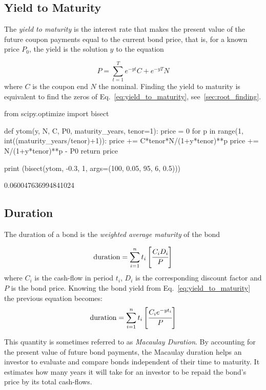 \subsection{Yield to Maturity}
The \emph{yield to maturity} is the interest rate that makes the present value of the future coupon payments equal to the current bond price, that is, 
for a known price $P_0$, the yield is the solution $y$ to the equation

\begin{equation}
P = \sum_{t=1}^T e^{-yt}C + e^{-yT}N 
\label{eq:yield_to_maturity}
\end{equation}
where $C$ is the coupon end $N$ the nominal.
Finding the yield to maturity is equivalent to find the zeros of Eq.~\ref{eq:yield_to_maturity}, see~\ref{sec:root_finding}.

\begin{ipythonnon}
from scipy.optimize import bisect 

def ytom(y, N, C, P0, maturity_years, tenor=1): 
    price = 0
    for p in range(1, int((maturity_years/tenor)+1)):
        price += C*tenor*N/(1+y*tenor)**p
    price += N/(1+y*tenor)**p - P0 
    return price

print (bisect(ytom, -0.3, 1, args=(100, 0.05, 95, 6, 0.5)))
\end{ipythonnon}
\begin{ioutput}
0.060047636994841024
\end{ioutput}

\subsection{Duration}
The duration of a bond is the \emph{weighted average maturity} of the bond

\begin{equation}
\textrm{duration} = \sum_{i=1}^{n} t_i \left[\cfrac{C_i D_i}{P}\right] 
\end{equation}
where $C_i$ is the cash-flow in period $t_i$, $D_i$ is the corresponding discount factor and $P$ is the bond price.
Knowing the bond yield from Eq.~\ref{eq:yield_to_maturity} the previous equation becomes:
\begin{equation}
\textrm{duration} = \sum_{i=1}^{n} t_i \left[\cfrac{C_i e^{-yt_i}}{P}\right] 
\label{eq:duration}
\end{equation}

This quantity is sometimes referred to as \emph{Macaulay Duration}. By accounting for the present value of future bond payments, the Macaulay duration helps an investor to evaluate and compare bonds independent of their time to maturity.
It estimates how many years it will take for an investor to be repaid the bond’s price by its total cash-flows.

